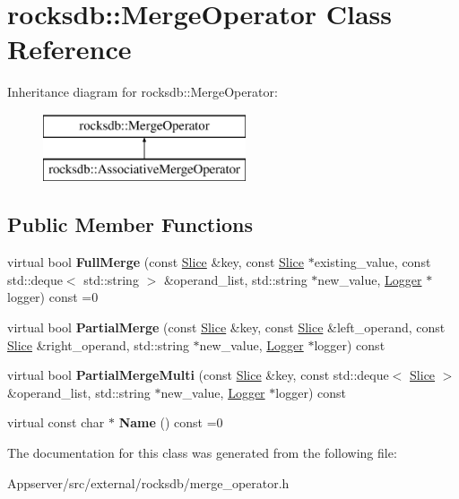 \hypertarget{classrocksdb_1_1MergeOperator}{}\section{rocksdb\+:\+:Merge\+Operator Class Reference}
\label{classrocksdb_1_1MergeOperator}
Inheritance diagram for rocksdb\+:\+:Merge\+Operator\+:\begin{figure}[H]
\begin{center}
\leavevmode
\includegraphics[height=2.000000cm]{classrocksdb_1_1MergeOperator}
\end{center}
\end{figure}
\subsection*{Public Member Functions}
\begin{DoxyCompactItemize}
\item 
virtual bool {\bfseries Full\+Merge} (const \hyperlink{classrocksdb_1_1Slice}{Slice} \&key, const \hyperlink{classrocksdb_1_1Slice}{Slice} $\ast$existing\+\_\+value, const std\+::deque$<$ std\+::string $>$ \&operand\+\_\+list, std\+::string $\ast$new\+\_\+value, \hyperlink{classrocksdb_1_1Logger}{Logger} $\ast$logger) const =0\hypertarget{classrocksdb_1_1MergeOperator_ab032c13fc4334b9c60a4eac4e29054ef}{}\label{classrocksdb_1_1MergeOperator_ab032c13fc4334b9c60a4eac4e29054ef}

\item 
virtual bool {\bfseries Partial\+Merge} (const \hyperlink{classrocksdb_1_1Slice}{Slice} \&key, const \hyperlink{classrocksdb_1_1Slice}{Slice} \&left\+\_\+operand, const \hyperlink{classrocksdb_1_1Slice}{Slice} \&right\+\_\+operand, std\+::string $\ast$new\+\_\+value, \hyperlink{classrocksdb_1_1Logger}{Logger} $\ast$logger) const\hypertarget{classrocksdb_1_1MergeOperator_a8baf472cfc0695f0c09e064c10771bb7}{}\label{classrocksdb_1_1MergeOperator_a8baf472cfc0695f0c09e064c10771bb7}

\item 
virtual bool {\bfseries Partial\+Merge\+Multi} (const \hyperlink{classrocksdb_1_1Slice}{Slice} \&key, const std\+::deque$<$ \hyperlink{classrocksdb_1_1Slice}{Slice} $>$ \&operand\+\_\+list, std\+::string $\ast$new\+\_\+value, \hyperlink{classrocksdb_1_1Logger}{Logger} $\ast$logger) const\hypertarget{classrocksdb_1_1MergeOperator_ab29bb3963d23a84299cba65315289049}{}\label{classrocksdb_1_1MergeOperator_ab29bb3963d23a84299cba65315289049}

\item 
virtual const char $\ast$ {\bfseries Name} () const =0\hypertarget{classrocksdb_1_1MergeOperator_a6ab6b3c60986ad1e9c9edbcfcae041c5}{}\label{classrocksdb_1_1MergeOperator_a6ab6b3c60986ad1e9c9edbcfcae041c5}

\end{DoxyCompactItemize}


The documentation for this class was generated from the following file\+:\begin{DoxyCompactItemize}
\item 
Appserver/src/external/rocksdb/merge\+\_\+operator.\+h\end{DoxyCompactItemize}
